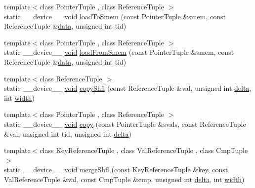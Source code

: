 \begin{DoxyCompactItemize}
\item 
{\footnotesize template$<$class Pointer\-Tuple , class Reference\-Tuple $>$ }\\static \-\_\-\-\_\-device\-\_\-\-\_\- \hyperlink{legacy_8hpp_a8bb47f092d473522721002c86c13b94e}{void} \hyperlink{structcv_1_1gpu_1_1device_1_1reduce__key__val__detail_1_1For_a8292fe3c9e1270431252e8cf4827b5ba}{load\-To\-Smem} (const Pointer\-Tuple \&smem, const Reference\-Tuple \&\hyperlink{legacy_8hpp_ab9fe6c09e6d02865a953fffc12fe6ca0}{data}, unsigned int tid)
\item 
{\footnotesize template$<$class Pointer\-Tuple , class Reference\-Tuple $>$ }\\static \-\_\-\-\_\-device\-\_\-\-\_\- \hyperlink{legacy_8hpp_a8bb47f092d473522721002c86c13b94e}{void} \hyperlink{structcv_1_1gpu_1_1device_1_1reduce__key__val__detail_1_1For_abec7f1da9283f41b0a235df66751bcfd}{load\-From\-Smem} (const Pointer\-Tuple \&smem, const Reference\-Tuple \&\hyperlink{legacy_8hpp_ab9fe6c09e6d02865a953fffc12fe6ca0}{data}, unsigned int tid)
\item 
{\footnotesize template$<$class Reference\-Tuple $>$ }\\static \-\_\-\-\_\-device\-\_\-\-\_\- \hyperlink{legacy_8hpp_a8bb47f092d473522721002c86c13b94e}{void} \hyperlink{structcv_1_1gpu_1_1device_1_1reduce__key__val__detail_1_1For_a9abeac6e76418349b7935d8326cc6d1f}{copy\-Shfl} (const Reference\-Tuple \&val, unsigned int \hyperlink{legacy_8hpp_ac867054f00f4be8b1f3ebce6fba31982}{delta}, int \hyperlink{highgui__c_8h_a2474a5474cbff19523a51eb1de01cda4}{width})
\item 
{\footnotesize template$<$class Pointer\-Tuple , class Reference\-Tuple $>$ }\\static \-\_\-\-\_\-device\-\_\-\-\_\- \hyperlink{legacy_8hpp_a8bb47f092d473522721002c86c13b94e}{void} \hyperlink{structcv_1_1gpu_1_1device_1_1reduce__key__val__detail_1_1For_aa5739a9c7b6556bfa406a208f0f71739}{copy} (const Pointer\-Tuple \&svals, const Reference\-Tuple \&val, unsigned int tid, unsigned int \hyperlink{legacy_8hpp_ac867054f00f4be8b1f3ebce6fba31982}{delta})
\item 
{\footnotesize template$<$class Key\-Reference\-Tuple , class Val\-Reference\-Tuple , class Cmp\-Tuple $>$ }\\static \-\_\-\-\_\-device\-\_\-\-\_\- \hyperlink{legacy_8hpp_a8bb47f092d473522721002c86c13b94e}{void} \hyperlink{structcv_1_1gpu_1_1device_1_1reduce__key__val__detail_1_1For_a09272157bfd731cbe7e105449380ccfe}{merge\-Shfl} (const Key\-Reference\-Tuple \&\hyperlink{core__c_8h_a68cf695b604d08c0b6f6f6bb282a6586}{key}, const Val\-Reference\-Tuple \&val, const Cmp\-Tuple \&cmp, unsigned int \hyperlink{legacy_8hpp_ac867054f00f4be8b1f3ebce6fba31982}{delta}, int \hyperlink{highgui__c_8h_a2474a5474cbff19523a51eb1de01cda4}{width})

\end{DoxyCompactItemize}
